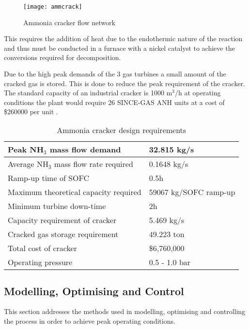 \begin{wrapfigure}{r}{0.36\textwidth}
	\centering
	\texttt{[image: ammcrack]}
	\caption{Ammonia cracker flow network}
\end{wrapfigure}

This requires the addition of heat due to the endothermic nature of the reaction and thus must be conducted in a furnace with a nickel catalyst to achieve the conversions required for decomposition.

Due to the high peak demands of the 3 gas turbines a small amount of the cracked gas is stored. This is done to reduce the peak requirement of the cracker. The standard capacity of an industrial cracker is 1000 m$^3$/h at operating conditions the plant would require 26 SINCE-GAS ANH units  at a cost of \$260000 per unit \cite{SinceGas2018}. 

\begin{table}[!htbp]
	\begin{center}
		\caption{Ammonia cracker design requirements}
		\begin{tabular}{ |l|l|  }
			
			\hline
			Peak NH$_3$ mass flow demand & 32.815 kg/s\\
			\hline
			Average NH$_3$ mass flow rate required & 0.1648 kg/s\\
			\hline
			Ramp-up time of SOFC&  0.5h\\
			\hline
			Maximum theoretical capacity required& 59067 kg/SOFC ramp-up\\
			\hline
			Minimum turbine down-time    &2h \\
			\hline
			Capacity requirement of cracker& 5.469 kg/s\\
			\hline
			Cracked gas storage requirement & 49.223 ton \\
			\hline
			Total cost of cracker & \$6,760,000 \\
			\hline
			Operating pressure & 0.5 - 1.0 bar \\
			\hline
		\end{tabular}
	\end{center}
\end{table}


\subsection{Modelling, Optimising and Control}
This section addresses the methods used in modelling, optimising and controlling the process in order to achieve peak operating conditions.

